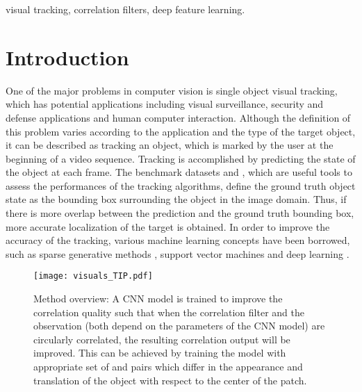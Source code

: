 \documentclass[journal]{IEEEtran}
\begin{document}
\let\svthefootnote\thefootnote
\let\thefootnote\relax{}


\addtocounter{footnote}{0}\let\thefootnote\svthefootnote

\begin{IEEEkeywords}
visual tracking, correlation filters, deep feature learning.
\end{IEEEkeywords}

\IEEEpeerreviewmaketitle
\section{Introduction}
\label{secIntro}
One of the major problems in computer vision is single object visual tracking, which has potential applications including visual surveillance, security and defense applications and human computer interaction. Although the definition of this problem varies according to the application and the type of the target object, it can be described as tracking an object, which is marked by the user at the beginning of a video sequence. Tracking is accomplished by predicting the state of the object at each frame. The benchmark datasets  \cite{Benchmark2013} and \cite{BenchmarkPAMI}, which are useful tools to assess the performances of the tracking algorithms, define the ground truth object state as the bounding box surrounding the object in the image domain. Thus, if there is more overlap between the prediction and the ground truth bounding box, more accurate localization of the target is obtained. In order to improve the accuracy of the tracking, various machine learning concepts have been borrowed, such as sparse generative methods \cite{L1APG, L1Other}, support vector machines \cite{STRUCK} and deep learning \cite{MDNET, PorikliBMVC2}.
\begin{figure}[ht]
\centering
\texttt{[image: visuals\_TIP.pdf]}
\caption{\small Method overview: A CNN model is trained to improve the correlation quality such that when the correlation filter  and the observation  (both depend on the parameters of the CNN model) are circularly correlated, the resulting correlation output will be improved. This can be achieved by training the model with appropriate set of  and  pairs which differ in the appearance and translation of the object with respect to the center of the patch.}
\label{algflow}
\normalsize
\end{figure}
\end{document}
